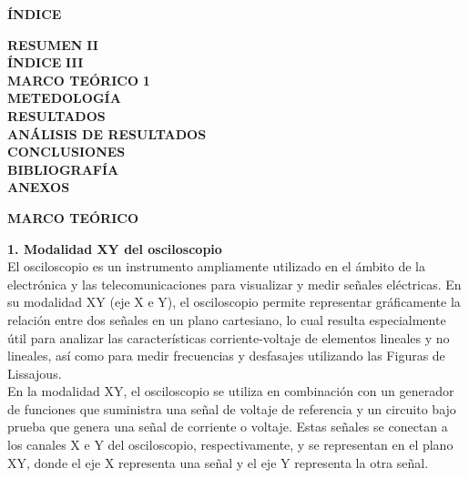 \documentclass[12pt]{article}
\begin{document}
	\newpage
	
	\begin{center}
		\textbf{\large ÍNDICE}\\
	\end{center}
	
	\noindent \textbf{RESUMEN} \hfill \textbf{II}\\
	\noindent \textbf{ÍNDICE} \hfill \textbf{III}\\
	\noindent \textbf{MARCO TEÓRICO} \hfill \textbf{1}\\
	\noindent \textbf{METEDOLOGÍA} \hfill \textbf{}\\
	\noindent \textbf{RESULTADOS} \hfill \textbf{}\\
	\noindent \textbf{ANÁLISIS DE RESULTADOS} \hfill \textbf{}\\
	\noindent \textbf{CONCLUSIONES} \hfill \textbf{}\\
	\noindent \textbf{BIBLIOGRAFÍA} \hfill \textbf{}\\
	\noindent \textbf{ANEXOS} \hfill \textbf{}\\
	
	\newpage
	
	
	\begin{center}
		\textbf{\large MARCO TEÓRICO}\\
	\end{center}
	
	\textbf{1. Modalidad XY del osciloscopio}\\
	
	El osciloscopio es un instrumento ampliamente utilizado en el ámbito de la electrónica y las telecomunicaciones para visualizar y medir señales eléctricas. En su modalidad XY (eje X e Y), el osciloscopio permite representar gráficamente la relación entre dos señales en un plano cartesiano, lo cual resulta especialmente útil para analizar las características corriente-voltaje de elementos lineales y no lineales, así como para medir frecuencias y desfasajes utilizando las Figuras de Lissajous.\\
	
	En la modalidad XY, el osciloscopio se utiliza en combinación con un generador de funciones que suministra una señal de voltaje de referencia y un circuito bajo prueba que genera una señal de corriente o voltaje. Estas señales se conectan a los canales X e Y del osciloscopio, respectivamente, y se representan en el plano XY, donde el eje X representa una señal y el eje Y representa la otra señal.\\
	
\end{document}
